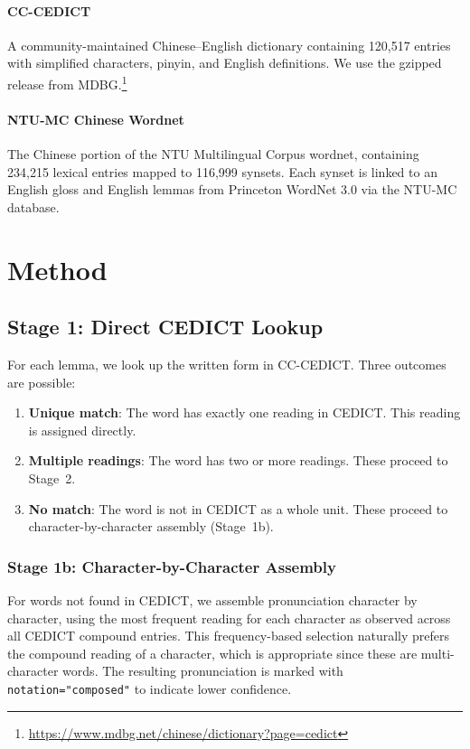 \documentclass[11pt,a4paper]{article}
\begin{document}
\paragraph{CC-CEDICT} A community-maintained Chinese--English
dictionary containing 120,517 entries with simplified characters,
pinyin, and English definitions.  We use the gzipped release from
MDBG.\footnote{\url{https://www.mdbg.net/chinese/dictionary?page=cedict}}

\paragraph{NTU-MC Chinese Wordnet} The Chinese portion of the NTU
Multilingual Corpus wordnet, containing 234,215 lexical entries mapped
to 116,999 synsets.  Each synset is linked to an English gloss and
English lemmas from Princeton WordNet 3.0 via the NTU-MC database.

\section{Method}

\subsection{Stage 1: Direct CEDICT Lookup}

For each lemma, we look up the written form in CC-CEDICT.  Three
outcomes are possible:

\begin{enumerate}[nosep]
\item \textbf{Unique match}: The word has exactly one reading in
  CEDICT.  This reading is assigned directly.
\item \textbf{Multiple readings}: The word has two or more readings.
  These proceed to Stage~2.
\item \textbf{No match}: The word is not in CEDICT as a whole unit.
  These proceed to character-by-character assembly (Stage~1b).
\end{enumerate}

\subsubsection{Stage 1b: Character-by-Character Assembly}

For words not found in CEDICT, we assemble pronunciation
character by character, using the most frequent reading for each
character as observed across all CEDICT compound entries.  This
frequency-based selection naturally prefers the compound reading of a
character, which is appropriate since these are multi-character words.
The resulting pronunciation is marked with \texttt{notation="composed"}
to indicate lower confidence.
\end{document}
